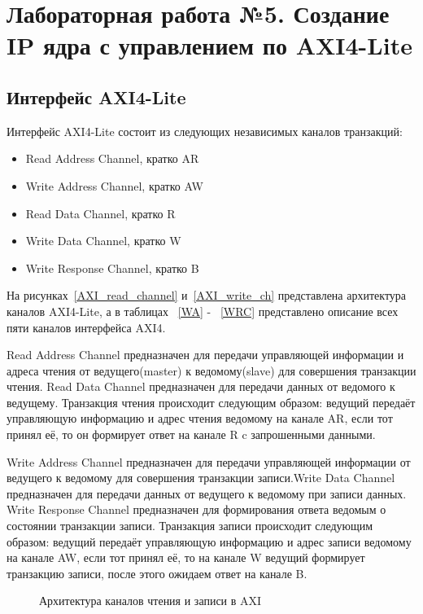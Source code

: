 \chapter{Лабораторная работа №5. Создание IP ядра с управлением по AXI4-Lite}

\section{Интерфейс AXI4-Lite}

Интерфейс AXI4-Lite состоит из следующих независимых каналов транзакций:

\begin{itemize}
	\item Read Address Channel, кратко AR
	\item Write Address Channel, кратко AW
	\item Read Data Channel, кратко R
	\item Write Data Channel, кратко W  
	\item Write Response Channel, кратко B
\end{itemize}

На рисунках~\ref{AXI_read_channel} и~\ref{AXI_write_ch} представлена архитектура каналов AXI4-Lite, а в таблицах ~\ref{WA} - ~\ref{WRC} представлено описание всех пяти каналов интерфейса AXI4.

Read Address Channel предназначен для передачи управляющей информации и адреса чтения от ведущего(master) к ведомому(slave) для совершения транзакции чтения. Read Data Channel предназначен для передачи данных от ведомого к ведущему. Транзакция чтения происходит следующим образом: ведущий передаёт управляющую информацию и адрес чтения ведомому на канале AR, если тот принял её, то он формирует ответ на канале R c запрошенными данными.

Write Address Channel предназначен для передачи управляющей информации от ведущего к ведомому для совершения транзакции записи.Write Data Channel предназначен для передачи данных от ведущего к ведомому при записи данных. Write Response Channel предназначен для формирования ответа ведомым о состоянии транзакции записи. Транзакция записи происходит следующим образом: ведущий передаёт управляющую информацию и адрес записи ведомому на канале AW, если тот принял её, то на канале W ведущий формирует транзакцию записи, после этого ожидаем ответ на канале B. 

\begin{figure}[htbp]	
	\caption{Архитектура каналов чтения и записи в AXI} %
\end{figure}

